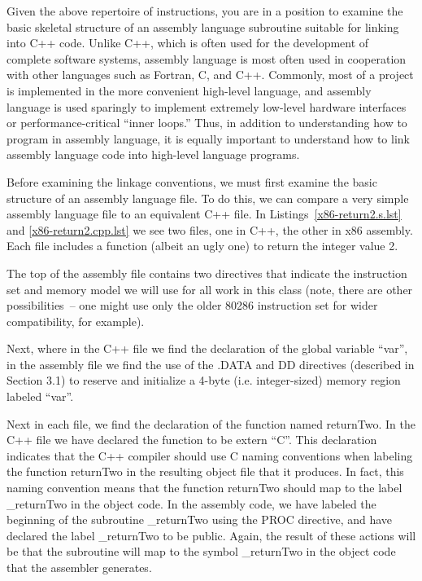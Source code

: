 Given the above repertoire of instructions, you are in a position to
examine the basic skeletal structure of an assembly language
subroutine suitable for linking into C++ code. Unlike C++, which is
often used for the development of complete software systems, assembly
language is most often used in cooperation with other languages such
as Fortran, C, and C++. Commonly, most of a project is implemented in
the more convenient high-level language, and assembly language is used
sparingly to implement extremely low-level hardware interfaces or
performance-critical ``inner loops.'' Thus, in addition to
understanding how to program in assembly language, it is equally
important to understand how to link assembly language code into
high-level language programs.

Before examining the linkage conventions, we must first examine the
basic structure of an assembly language file. To do this, we can
compare a very simple assembly language file to an equivalent C++
file. In Listings~\ref{x86-return2.s.lst} and \ref{x86-return2.cpp.lst} we see
two files, one in C++, the other in x86 assembly. Each file includes a
function (albeit an ugly one) to return the integer value 2.

The top of the assembly file contains two directives that indicate the
instruction set and memory model we will use for all work in this
class (note, there are other possibilities~-- one might use only the
older 80286 instruction set for wider compatibility, for example).

Next, where in the C++ file we find the declaration of the global
variable ``var'', in the assembly file we find the use of the .DATA
and DD directives (described in Section 3.1) to reserve and initialize
a 4-byte (i.e. integer-sized) memory region labeled ``var''.

\begin{figure}

\vspace{-0.25in}\end{figure}

Next in each file, we find the declaration of the function named
returnTwo. In the C++ file we have declared the function to be extern
``C''. This declaration indicates that the C++ compiler should use C
naming conventions when labeling the function returnTwo in the
resulting object file that it produces. In fact, this naming
convention means that the function returnTwo should map to the label
\_returnTwo in the object code. In the assembly code, we have labeled
the beginning of the subroutine \_returnTwo using the PROC directive,
and have declared the label \_returnTwo to be public. Again, the
result of these actions will be that the subroutine will map to the
symbol \_returnTwo in the object code that the assembler generates.

